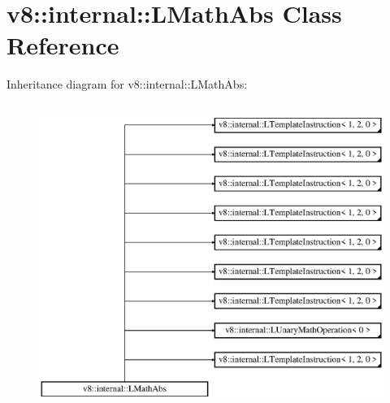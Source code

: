 \hypertarget{classv8_1_1internal_1_1_l_math_abs}{}\section{v8\+:\+:internal\+:\+:L\+Math\+Abs Class Reference}
\label{classv8_1_1internal_1_1_l_math_abs}
Inheritance diagram for v8\+:\+:internal\+:\+:L\+Math\+Abs\+:\begin{figure}[H]
\begin{center}
\leavevmode
\includegraphics[height=10.000000cm]{classv8_1_1internal_1_1_l_math_abs}
\end{center}
\end{figure}
